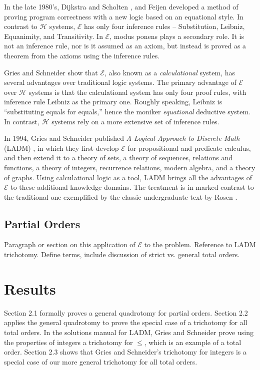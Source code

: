 \documentclass[12pt, fleqn, leqno]{article}
\begin{document}
In the late 1980's, Dijkstra and Scholten \cite{DandS}, and Feijen \cite{Feij} developed a method of proving program correctness with a new logic based on an equational style.
In contrast to $\mathcal{H}$ systems, $\mathcal{E}$ has only four inference rules -- Substitution, Leibniz, Equanimity, and Transitivity.
In $\mathcal{E}$, modus ponens plays a secondary role.
It is not an inference rule, nor is it assumed as an axiom, but instead is proved as a theorem from the axioms using the inference rules.

Gries and Schneider \cite{Gries1995, Gries1995145} show that $\mathcal{E}$, also known as a \textit{calculational} system, has several advantages over traditional logic systems.
The primary advantage of $\mathcal{E}$ over $\mathcal{H}$ systems is that the calculational system has only four proof rules, with inference rule Leibniz as the primary one.
Roughly speaking, Leibniz is ``substituting equals for equals,'' hence the moniker \textit{equational} deductive system.
In contrast, $\mathcal{H}$ systems rely on a more extensive set of inference rules.

In 1994, Gries and Schneider published \textit{A Logical Approach to Discrete Math} (LADM) \cite{LADM}, in which they first develop $\mathcal{E}$ for propositional and predicate calculus, and then extend it to a theory of sets, a theory of sequences, relations and functions, a theory of integers, recurrence relations, modern algebra, and a theory of graphs.
Using calculational logic as a tool, LADM brings all the advantages of $\mathcal{E}$ to these additional knowledge domains.
The treatment is in marked contrast to the traditional one exemplified by the classic undergraduate text by Rosen \cite{Rosen}.

\subsection{Partial Orders}

Paragraph or section on this application of $\mathcal{E}$ to the problem.
Reference to LADM trichotomy.
Define terms, include discussion of strict vs. general total orders.

\section{Results}

Section 2.1 formally proves a general quadrotomy for partial orders.
Section 2.2 applies the general quadrotomy to prove the special case of a trichotomy for all total orders.
In the solutions manual for LADM, Gries and Schneider prove using the properties of integers a trichotomy for $\le$, which is an example of a total order.
Section 2.3 shows that Gries and Schneider's trichotomy for integers is a special case of our more general trichotomy for all total orders.
\end{document}
